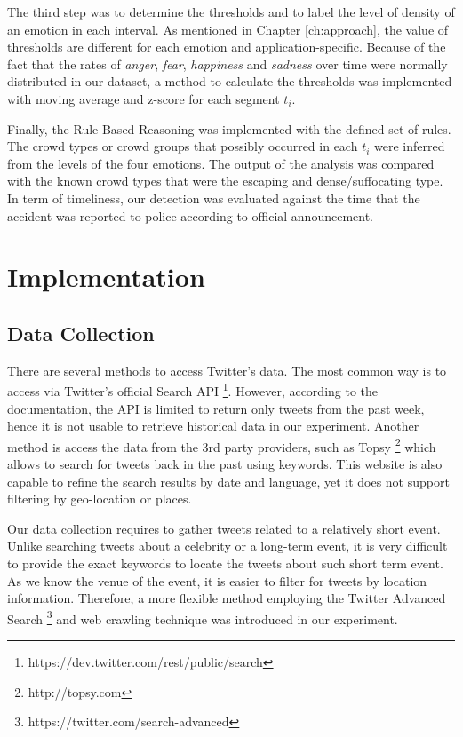 The third step was to determine the thresholds and to label the level of density of an emotion in each interval. As mentioned in Chapter \ref{ch:approach}, the value of thresholds are different for each emotion and application-specific. Because of the fact that the rates of \textit{anger}, \textit{fear}, \textit{happiness} and \textit{sadness} over time were normally distributed in our dataset, a method to calculate the thresholds was implemented with moving average and z-score for each segment \(t_i\). 

Finally, the Rule Based Reasoning was implemented with the defined set of rules. The crowd types or crowd groups that possibly occurred in each \(t_i\) were inferred from the levels of the four emotions. The output of the analysis was compared with the known crowd types that were the escaping and dense/suffocating type. In term of timeliness, our detection was evaluated against the time that the accident was reported to police according to official announcement.

\section{Implementation}

\subsection{Data Collection}
There are several methods to access Twitter's data. The most common way is to access via Twitter's official Search API \footnote{https://dev.twitter.com/rest/public/search}. However, according to the documentation, the API is limited to return only tweets from the past week, hence it is not usable to retrieve historical data in our experiment. Another method is access the data from the 3rd party providers, such as Topsy \footnote{http://topsy.com} which allows to search for tweets back in the past using keywords. This website is also capable to refine the search results by date and language, yet it does not support filtering by geo-location or places. 

Our data collection requires to gather tweets related to a relatively short event. Unlike searching tweets about a celebrity or a long-term event, it is very difficult to provide the exact keywords to locate the tweets about such short term event. As we know the venue of the event, it is easier to filter for tweets by location information. Therefore, a more flexible method employing the Twitter Advanced Search \footnote{https://twitter.com/search-advanced} and web crawling technique was introduced in our experiment.

